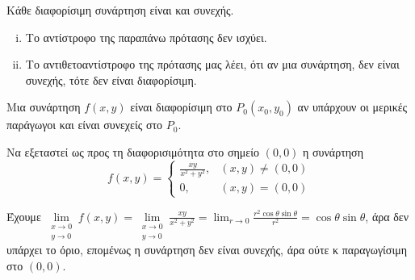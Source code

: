 \begin{prop}
    Κάθε διαφορίσιμη συνάρτηση είναι και συνεχής.
\end{prop}

\begin{rem}
\item {}
    \begin{enumerate}[i)]
        \item Το αντίστροφο της παραπάνω πρότασης δεν ισχύει.
        \item Το αντιθετοαντίστροφο της πρότασης μας λέει, ότι αν μια συνάρτηση, 
            δεν είναι συνεχής, τότε δεν είναι διαφορίσιμη.
    \end{enumerate}
\end{rem}
\begin{thm}
\item {}
    Μια συνάρτηση $ f(x,y) $ είναι διαφορίσιμη στο $ P_{0}(x_{0}, y_{0}) $ 
    αν υπάρχουν οι μερικές παράγωγοι και είναι συνεχείς στο $ P_{0} $.
\end{thm}

\newpage

\begin{example}
    Να εξεταστεί ως προς τη διαφορισιμότητα στο σημείο $(0,0)$ 
    η συνάρτηση 
    \[ f(x,y) = \begin{cases} \frac{xy}{x^{2}+y^{2}}, &(x,y) \neq (0,0) \\ 0, & (x,y)
    = (0,0) \end{cases} \]
    \begin{solution}
    \item {}
        Έχουμε
        $ \lim\limits_{\substack{x\to 0 \\y \to 0}} f(x,y) =
        \lim\limits_{\substack{x\to 0 \\y \to 0}} \frac{xy}{x^{2}+y^{2}} =
        \lim_{r \to 0} \frac{r^{2} \cos{\theta} \sin{\theta}}{r^{2}} =
        \cos{\theta} \sin{\theta} $, άρα δεν υπάρχει το όριο, επομένως η συνάρτηση
        δεν είναι συνεχής, άρα ούτε κ παραγωγίσιμη στο $ (0,0) $.
    \end{solution}
\end{example}

